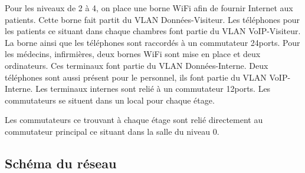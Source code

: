 Pour les niveaux de 2 à 4, on place une borne WiFi afin de fournir Internet aux patients.
Cette borne fait partit du VLAN Données-Visiteur. Les téléphones pour les patients ce situant dans chaque chambres font partie du VLAN VoIP-Visiteur.
La borne ainsi que les téléphones sont raccordés à un commutateur 24ports.
Pour les médecins, infirmières, deux bornes WiFi sont mise en place et deux ordinateurs.
Ces terminaux font partie du VLAN Données-Interne. Deux téléphones sont aussi présent pour le personnel, ils font partie du VLAN VoIP-Interne.
Les terminaux internes sont relié à un commutateur 12ports.
Les commutateurs se situent dans un local pour chaque étage.

Les commutateurs ce trouvant à chaque étage sont relié directement au commutateur principal ce situant dans la salle du niveau 0.

%
%
\subsection{Schéma du réseau}
